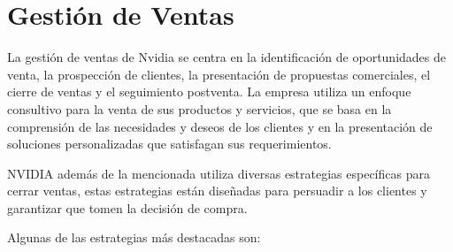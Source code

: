 \documentclass{article}
\begin{document}

\newpage
\section{Gestión de Ventas}

La gestión de ventas de Nvidia se centra en la identificación de oportunidades de venta, la prospección de clientes, la presentación de propuestas comerciales, el cierre de ventas y el seguimiento postventa. La empresa utiliza un enfoque consultivo para la venta de sus productos y servicios, que se basa en la comprensión de las necesidades y deseos de los clientes y en la presentación de soluciones personalizadas que satisfagan sus requerimientos.

NVIDIA además de la mencionada utiliza diversas estrategias específicas para cerrar ventas, estas estrategias están diseñadas para persuadir a los clientes y garantizar que tomen la decisión de compra. 

Algunas de las estrategias más destacadas son: 
\end{document}
